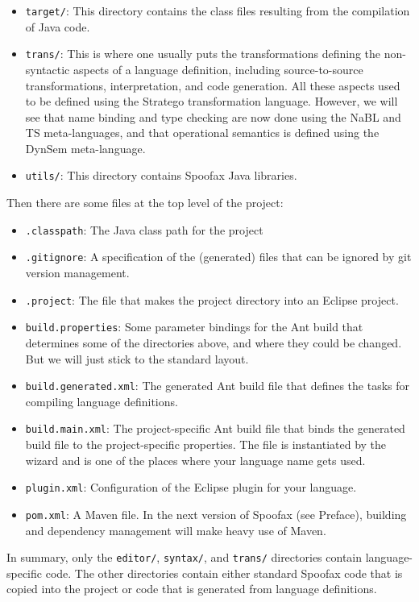 \begin{itemize}
  \item \texttt{target/}: This directory contains the class files resulting from
  the compilation of Java code.
  \item \texttt{trans/}: This is where one usually puts the transformations
  defining the non-syntactic aspects of a language definition, including
  source-to-source transformations, interpretation, and code generation. All
  these aspects used to be defined using the Stratego transformation language.
  However, we will see that name binding and type checking are now done using
  the NaBL and TS meta-languages, and that operational semantics is defined
  using the DynSem meta-language.
  \item \texttt{utils/}: This directory contains Spoofax Java libraries.
\end{itemize}

Then there are some files at the top level of the project:

\begin{itemize}
  \item \texttt{.classpath}: The Java class path for the project
  \item \texttt{.gitignore}: A specification of the (generated) files that can
  be ignored by git version management.
  \item \texttt{.project}: The file that makes the project directory into an
  Eclipse project.
  \item \texttt{build.properties}: Some parameter bindings for the Ant build
  that determines some of the directories above, and where they could be
  changed. But we will just stick to the standard layout.
  \item \texttt{build.generated.xml}: The generated Ant build file that defines
  the tasks for compiling language definitions.
  \item \texttt{build.main.xml}: The project-specific Ant build file that binds
  the generated build file to the project-specific properties. The file is
  instantiated by the wizard and is one of the places where your language name
  gets used.
  \item \texttt{plugin.xml}: Configuration of the Eclipse plugin for your
  language.
  \item \texttt{pom.xml}: A Maven file. In the next version of Spoofax (see
  Preface), building and dependency management will make heavy use of Maven.
\end{itemize}

In summary, only the \texttt{editor/}, \texttt{syntax/}, and \texttt{trans/}
directories contain language-specific code. 
The other directories contain either standard Spoofax code that is copied into
the project or code that is generated from language definitions.

